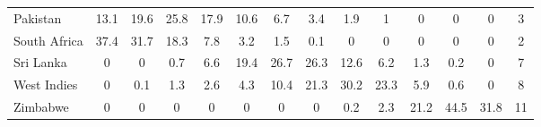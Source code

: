 \documentclass[12pt,A4]{article}
\begin{document}
\begin{table}[]
{\begin{tabular}{@{}lccccccccccccc@{}}
			Pakistan     & 13.1 & 19.6 & 25.8 & 17.9 & 10.6 & 6.7  & 3.4  & 1.9  & 1    & 0    & 0    & 0    & 3  \\
			South Africa & 37.4 & 31.7 & 18.3 & 7.8  & 3.2  & 1.5  & 0.1  & 0    & 0    & 0    & 0    & 0    & 2  \\
			Sri Lanka    & 0    & 0    & 0.7  & 6.6  & 19.4 & 26.7 & 26.3 & 12.6 & 6.2  & 1.3  & 0.2  & 0    & 7  \\
			West Indies  & 0    & 0.1  & 1.3  & 2.6  & 4.3  & 10.4 & 21.3 & 30.2 & 23.3 & 5.9  & 0.6  & 0    & 8  \\
			Zimbabwe     & 0    & 0    & 0    & 0    & 0    & 0    & 0    & 0.2  & 2.3  & 21.2 & 44.5 & 31.8 & 11 \\ \bottomrule
		\end{tabular}%
	}
\end{table}
\end{document}
